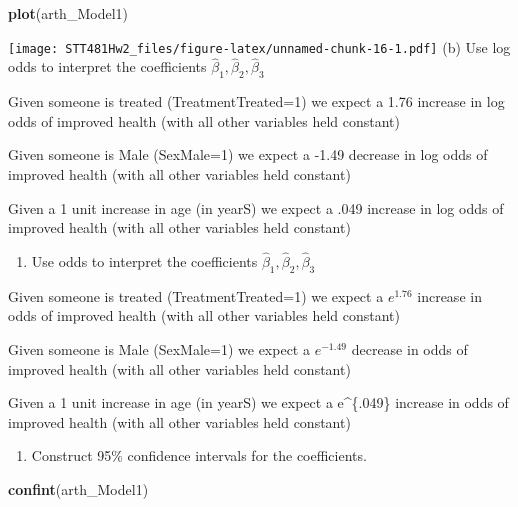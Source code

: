 \documentclass[]{article}
\newenvironment{Shaded}{\begin{snugshade}}{\end{snugshade}}
\newcommand{\KeywordTok}[1]{\textcolor[rgb]{0.13,0.29,0.53}{\textbf{#1}}}
\newcommand{\NormalTok}[1]{#1}
\providecommand{\tightlist}{%
  \setlength{\itemsep}{0pt}\setlength{\parskip}{0pt}}
\begin{document}
\begin{Shaded}
\begin{Highlighting}[]
\KeywordTok{plot}\NormalTok{(arth_Model1)}
\end{Highlighting}
\end{Shaded}

\texttt{[image: STT481Hw2\_files/figure-latex/unnamed-chunk-16-1.pdf]}
(b) Use log odds to interpret the coefficients
\(\hat{\beta}_1 ,\hat{\beta}_2, \hat{\beta}_3\)

Given someone is treated (TreatmentTreated=1) we expect a 1.76 increase
in log odds of improved health (with all other variables held constant)

Given someone is Male (SexMale=1) we expect a -1.49 decrease in log odds
of improved health (with all other variables held constant)

Given a 1 unit increase in age (in yearS) we expect a .049 increase in
log odds of improved health (with all other variables held constant)

\begin{enumerate}
\def\labelenumi{(\alph{enumi})}
\setcounter{enumi}{2}
\tightlist
\item
  Use odds to interpret the coefficients
  \(\hat{\beta}_1 ,\hat{\beta}_2, \hat{\beta}_3\)
\end{enumerate}

Given someone is treated (TreatmentTreated=1) we expect a \(e^{1.76}\)
increase in odds of improved health (with all other variables held
constant)

Given someone is Male (SexMale=1) we expect a \(e^{-1.49}\) decrease in
odds of improved health (with all other variables held constant)

Given a 1 unit increase in age (in yearS) we expect a e\^{}\{.049\}
increase in odds of improved health (with all other variables held
constant)

\begin{enumerate}
\def\labelenumi{(\alph{enumi})}
\setcounter{enumi}{3}
\tightlist
\item
  Construct 95\% confidence intervals for the coefficients.
\end{enumerate}

\begin{Shaded}
\begin{Highlighting}[]
\KeywordTok{confint}\NormalTok{(arth_Model1)}
\end{Highlighting}
\end{Shaded}
\end{document}
